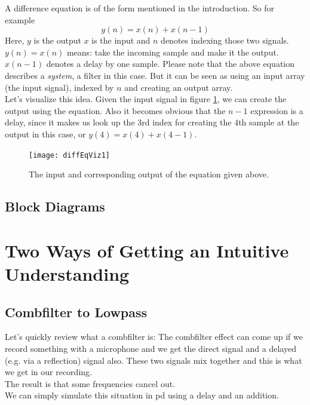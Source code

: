 A difference equation is of the form mentioned in the introduction. So for example 
\begin{equation}
	y(n) = x(n)+x(n-1)
\end{equation}
Here, $y$ is the output $x$ is the input and $n$ denotes indexing those two signals.\\
$y(n)=x(n)$ means: take the incoming sample and make it the output. $x(n-1)$ denotes a delay by one sample. Please note that the above equation describes a \textit{system}, a filter in this case. But it can be seen as using an input array (the input signal), indexed by $n$ and creating an output array.\\
Let's visualize this idea. Given the input signal in figure \ref{fig:diffImpResp}, we can create the output using the equation. Also it becomes obvious that the $n-1$ expression is a delay, since it makes us look up the 3rd index for creating the 4th sample at the output in this case, or $y(4) = x(4)+x(4-1)$.
\begin{figure}[h!]
	\centering
	\texttt{[image: diffEqViz1]}
	\caption[shortCaption]
	{The input and corresponding output of the equation given above.}
	\label{fig:diffImpResp}
\end{figure}


\subsection{Block Diagrams} %
\label{sub:block}




\section{Two Ways of Getting an Intuitive Understanding}

\subsection{Combfilter to Lowpass}
Let's quickly review what a combfilter is:
The combfilter effect can come up if we record something with a microphone and we get the direct signal and a delayed (e.g. via a reflection) signal also. These two signals mix together and this is what we get in our recording.\\
The result is that some frequencies cancel out.\\
We can simply simulate this situation in pd using a delay and an addition. 

